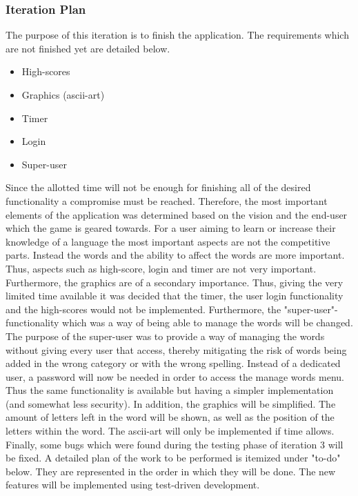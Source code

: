 \documentclass[12pt, letterpaper]{article}
\begin{document}
\subsubsection{Iteration Plan}
The purpose of this iteration is to finish the application. The requirements which are not finished yet are detailed below.
\begin{itemize}
	\item High-scores
	\item Graphics (ascii-art)
	\item Timer
	\item Login
	\item Super-user
\end{itemize}
Since the allotted time will not be enough for finishing all of the desired functionality a compromise must be reached. Therefore, the most important elements of the application was determined based on the vision and the end-user which the game is geared towards. For a user aiming to learn or increase their knowledge of a language the most important aspects are not the competitive parts. Instead the words and the ability to affect the words are more important. Thus, aspects such as high-score, login and timer are not very important. Furthermore, the graphics are of a secondary importance. Thus, giving the very limited time available it was decided that the timer, the user login functionality and the high-scores would not be implemented.
\newline
\newline
 Furthermore, the "super-user"-functionality which was a way of being able to manage the words will be changed. The purpose of the super-user was to provide a way of managing the words without giving every user that access, thereby mitigating the risk of words being added in the wrong category or with the wrong spelling. Instead of a dedicated user, a password will now be needed in order to access the manage words menu. Thus the same functionality is available but having a simpler implementation (and somewhat less security).
 \newline
 \newline
 In addition, the graphics will be simplified. The amount of letters left in the word will be shown, as well as the position of the letters within the word. The ascii-art will only be implemented if time allows.
 \newline
 \newline
 Finally, some bugs which were found during the testing phase of iteration 3 will be fixed. A detailed plan of the work to be performed is itemized under "to-do" below. They are represented in the order in which they will be done. The new features will be implemented using test-driven development.
\end{document}
